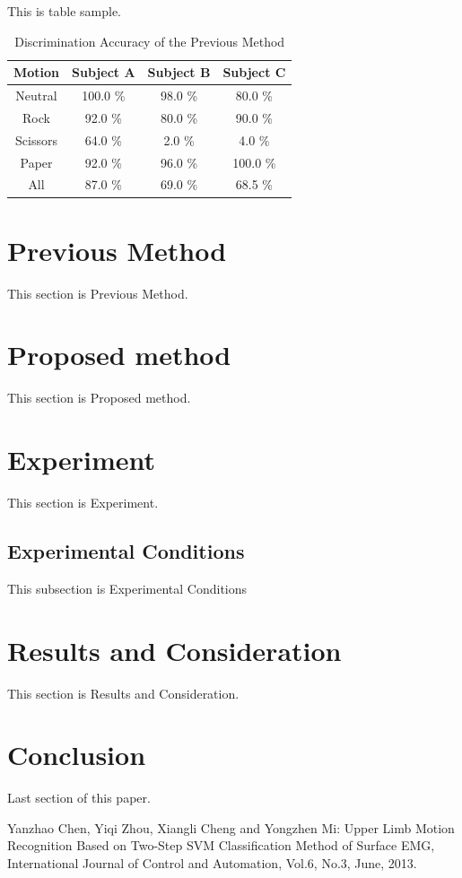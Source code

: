 \documentclass[conference]{IEEEtran}
\begin{document}
  This is table sample.

  \begin{table}[!t]
    \renewcommand{\arraystretch}{1.3}
    \caption{Discrimination Accuracy of the Previous Method}
    \label{table:prev_method_result}
    \centering
    \begin{tabular}{c||c|c|c}
      \hline
      \bfseries Motion & \bfseries Subject A & \bfseries Subject B & \bfseries Subject C\\
      \hline\hline
      Neutral & 100.0 \% & 98.0 \% & 80.0 \%\\\hline
      Rock & 92.0 \% & 80.0 \% & 90.0 \%\\\hline
      Scissors & 64.0 \% & 2.0 \% & 4.0 \%\\\hline
      Paper & 92.0 \% & 96.0 \% & 100.0 \%\\\hline\hline
      All & 87.0 \% & 69.0 \% & 68.5 \%\\\hline
    \end{tabular}
  \end{table}

\section{Previous Method}
This section is Previous Method.


\section{Proposed method}
This section is Proposed method.

\section{Experiment}
  This section is Experiment.

  \subsection{Experimental Conditions}
    This subsection is Experimental Conditions

\section{Results and Consideration}
  This section is Results and Consideration.

\section{Conclusion}
  Last section of this paper.

\begin{thebibliography}{3}

Yanzhao Chen, Yiqi Zhou, Xiangli Cheng and Yongzhen Mi: Upper Limb Motion Recognition Based on Two-Step SVM Classification Method of Surface EMG, International Journal of Control and Automation, Vol.6, No.3, June, 2013.

\end{thebibliography}
\end{document}
